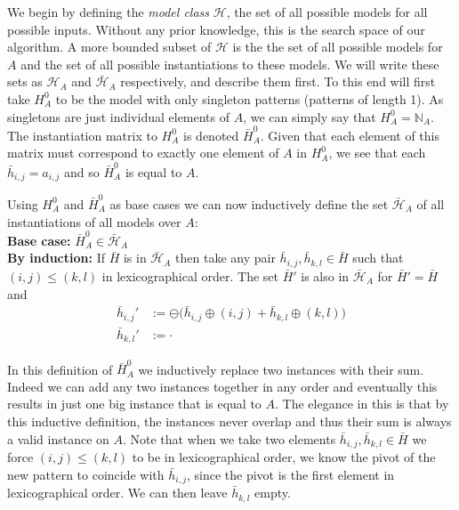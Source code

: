 \documentclass{llncs}
\begin{document}
We begin by defining the \emph{model class} $\mathcal{H}$, the set of all possible models for all possible inputs. Without any prior knowledge, this is the search space of our algorithm. A more bounded subset of $\mathcal{H}$ is the the set of all possible models for $A$ and the set of all possible instantiations to these models. We will write these sets as $\mathcal{H}_A$ and $\bar{\mathcal{H}}_A$ respectively, and describe them first. To this end will first take $H_A^0$ to be the model with only singleton patterns (patterns of length 1). As singletons are just individual elements of $A$, we can simply say that $H_A^0=\mathbb{N}_A$. The instantiation matrix to $H_A^0$ is denoted $\bar{H}_A^0$. Given that each element of this matrix must correspond to exactly one element of $A$ in $H_A^0$, we see that each $\bar{h}_{i,j} = a_{i,j}$ and so $\bar{H}_A^0$ is equal to $A$. 

Using $H_A^0$ and $\bar{H}_A^0$ as base cases we can now inductively define the set $\bar{\mathcal{H}}_A$ of all instantiations of all models over $A$:\\
\textbf{Base case:} $\bar{H}_A^0 \in \bar{\mathcal{H}}_A$\\
\textbf{By induction:} If $\bar{H}$ is in $\bar{\mathcal{H}}_A$ then take any pair $\bar{h}_{i,j},\bar{h}_{k,l} \in \bar{H}$ such that $(i,j)\leq(k,l)$ in lexicographical order. The set $\bar{H}'$ is also in $\bar{\mathcal{H}}_A$ for $\bar{H}' = \bar{H}$ and
\begin{align*}
\bar{h}_{i,j}' &:= \ominus \big( \bar{h}_{i,j} \oplus (i,j) + \bar{h}_{k,l} \oplus (k,l) \big) \\
\bar{h}_{k,l}' &:= \cdot
\end{align*}

In this definition of $\bar{H}_A^0$ we inductively replace two instances with their sum. Indeed we can add any two instances together in any order and eventually this results in just one big instance that is equal to $A$. The elegance in this is that by this inductive definition, the instances never overlap and thus their sum is always a valid instance on $A$. Note that when we take two elements $\bar{h}_{i,j},\bar{h}_{k,l} \in \bar{H}$ we force $(i,j)\leq(k,l)$ to be in lexicographical order, we know the pivot of the new pattern to coincide with $\bar{h}_{i,j}$, since the pivot is the first element in lexicographical order. We can then leave $\bar{h}_{k,l}$ empty.
\end{document}

